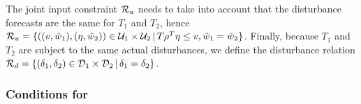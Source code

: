 %
The joint input constraint $\mathcal{R}_{u}$ needs to take into account that the disturbance forecasts are the same for $T_{1}$ and $T_2$, hence $\mathcal{R}_{u} = \{ ((v, \tilde{w}_{1}), (\eta, \tilde{w}_{2})) \in \mathcal{U}_{1} \times \mathcal{U}_{2} \,|\, T \rho^{T} \eta \leq v, \tilde{w}_{1} = \tilde{w}_{2} \}$.
Finally, because $T_{1}$ and $T_{2}$ are subject to the same actual disturbances, we define the disturbance relation $\mathcal{R}_{d} = \{ (\delta_{1}, \delta_{2}) \in \mathcal{D}_{1} \times \mathcal{D}_{2} \,|\, \delta_{1} = \delta_{2} \}$.

\subsubsection{Conditions for \RSet} %
\label{sec:abstraction-gs:feedback:conditions}

